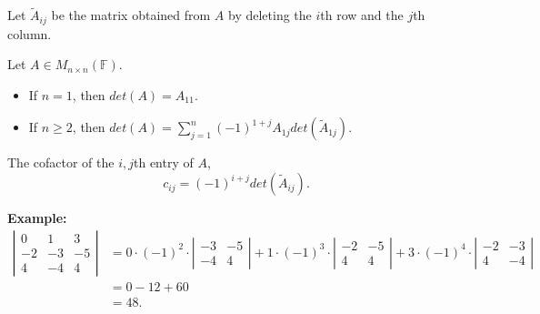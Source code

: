 \documentclass[12pt]{article}
\newenvironment{definition}[2][Definition]{\begin{trivlist}
\item[\hskip \labelsep {\bfseries #1}\hskip \labelsep {\bfseries #2}]}{\end{trivlist}}
\begin{document}
Let $\tilde{A}_{ij}$ be the matrix obtained from $A$ by deleting the $i$th row and the $j$th column.

\begin{definition}{2}
Let $A \in M_{n \times n}(\mathbb{F})$.

\begin{itemize}
    \item If $n = 1$, then $det(A) = A_{11}$.
    
    \item If $n \geq 2$, then $det(A) = \sum_{j = 1}^n(-1)^{1 + j}A_{1j}det(\tilde{A}_{1j})$.
\end{itemize}
\end{definition}

\noindent The cofactor of the $i,j$th entry of $A$, $$c_{ij} = (-1)^{i + j}det(\tilde{A}_{ij}).$$

\noindent\textbf{Example:} \begin{align*}
    \left| \begin{array}{ccc}
         0 & 1 & 3 \\ -2 & -3 & -5 \\ 4 & -4 & 4
    \end{array} \right| &= 0 \cdot (-1)^2 \cdot \left| \begin{array}{cc}
        -3 & -5 \\
        -4 & 4
    \end{array} \right| + 1 \cdot (-1)^3 \cdot \left| \begin{array}{cc}
        -2 & -5 \\ 4 & 4
    \end{array} \right| + 3 \cdot (-1)^4 \cdot \left| \begin{array}{cc}
        -2 & -3 \\ 4 & -4
    \end{array} \right| \\
    &= 0 - 12 + 60 \\
    &= 48.
\end{align*}
\end{document}
